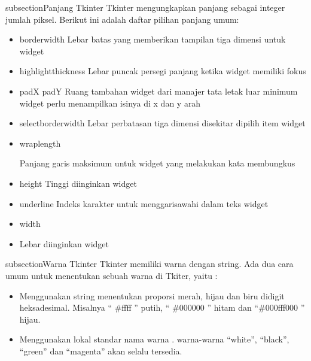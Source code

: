 \documentclass [12pt,a4paper,notitlepage,oneside,bahasa]{article}
\begin{document}
\begin{enumerate}
 
 \hspace*{0.5in} \vspace{12pt}
 subsection{Panjang Tkinter}
 \hspace*{0.5in} Tkinter mengungkapkan panjang sebagai integer jumlah piksel. Berikut ini adalah daftar pilihan panjang umum:
\noindent 
\begin{itemize}
	\item borderwidth
	Lebar batas yang memberikan tampilan tiga dimensi untuk widget
	\item highlightthickness
	Lebar puncak persegi panjang ketika widget memiliki fokus
 	\item padX padY
	Ruang tambahan widget dari manajer tata letak luar minimum widget perlu menampilkan isinya di x dan y arah
	\item selectborderwidth
	Lebar perbatasan tiga dimensi disekitar dipilih item widget
	\item wraplength \par
	Panjang garis maksimum untuk widget yang melakukan kata membungkus
	\item height
	Tinggi diinginkan widget
	\item underline
	Indeks karakter untuk menggarisawahi dalam teks widget 
	\item width
	\item Lebar diinginkan widget
\end{itemize}
 
\noindent 
subsection{Warna Tkinter}
\noindent 
Tkinter memiliki warna dengan string. Ada dua cara umum untuk menentukan sebuah warna di Tkiter, yaitu : \par
\noindent 
\begin{itemize}
	\item Menggunakan string menentukan proporsi merah, hijau dan biru didigit heksadesimal. Misalnya  `` \#ffff '' putih,  ``  \#000000 '' hitam dan  ``\#000fff000 '' hijau.
\noindent 
	\item Menggunakan lokal standar nama warna . warna-warna ``white'', ``black'',  ``green'' dan  ``magenta'' akan selalu tersedia.
\end{itemize}


\end{enumerate}
\end{document}
